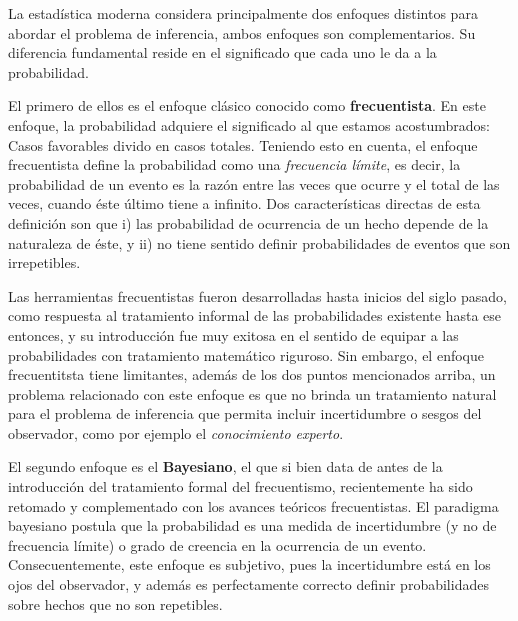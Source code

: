 La estadística moderna considera principalmente dos enfoques distintos para abordar el problema de inferencia, ambos enfoques son complementarios. Su diferencia fundamental reside en el significado que cada uno le da a la probabilidad.

El primero de ellos es el enfoque clásico conocido como \textbf{frecuentista}. En este enfoque, la probabilidad adquiere el significado al que estamos acostumbrados: Casos favorables divido en casos totales. Teniendo esto en cuenta, el enfoque frecuentista define la probabilidad como una \emph{frecuencia límite}, es decir, la probabilidad de un evento es la razón entre las veces que ocurre y el total de las veces, cuando éste último tiene a infinito. Dos características directas de esta definición son que i) las probabilidad de ocurrencia de un hecho depende de la naturaleza de éste, y ii) no tiene sentido definir probabilidades de eventos que son irrepetibles.

Las herramientas frecuentistas fueron desarrolladas hasta inicios del siglo pasado, como respuesta al tratamiento informal de las probabilidades existente hasta ese entonces, y su introducción fue muy exitosa en el sentido de equipar a las probabilidades con tratamiento matemático riguroso. Sin embargo, el enfoque frecuentitsta tiene limitantes, además de los dos puntos mencionados arriba, un problema relacionado con este enfoque es que no brinda un tratamiento natural para el problema de inferencia que permita incluir incertidumbre o sesgos del observador, como por ejemplo el  \emph{conocimiento experto}.

El segundo enfoque es el \textbf{Bayesiano}, el que si bien data de antes de la introducción del tratamiento formal del frecuentismo, recientemente ha sido retomado y complementado con los avances teóricos frecuentistas. El paradigma bayesiano postula que la probabilidad es una medida de incertidumbre (y no de frecuencia límite) o grado de creencia en la ocurrencia de un evento. Consecuentemente, este enfoque es subjetivo, pues la incertidumbre está en los ojos del observador, y además es perfectamente correcto definir probabilidades sobre hechos que no son repetibles.

